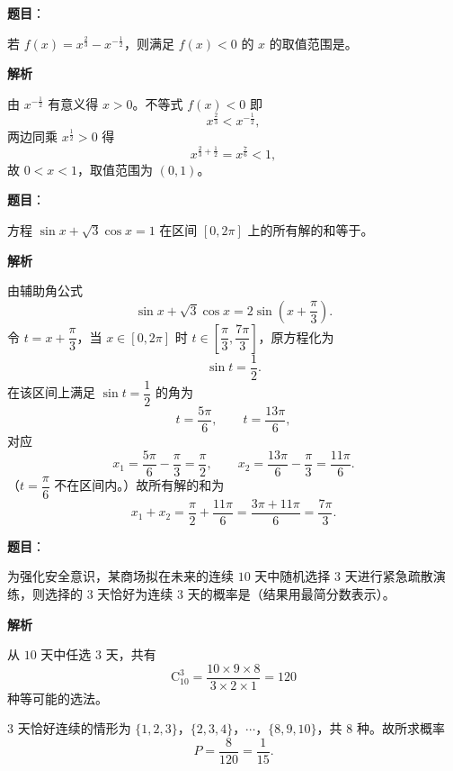 \begin{answer}

\textbf{题目}：

若 $f(x)=x^{\frac23}-x^{-\frac12}$，则满足 $f(x)<0$ 的 $x$ 的取值范围是\gkblank{}。

\textbf{解析}

由 $x^{-\frac12}$ 有意义得 $x>0$。不等式 $f(x)<0$ 即
\nopagebreak[4]
\[x^{\frac23}<x^{-\frac12},\]
两边同乘 $x^{\frac12}>0$ 得
\nopagebreak[4]
\[x^{\frac23+\frac12}=x^{\frac76}<1,\]
故 $0<x<1$，取值范围为 $(0,1)$。


\end{answer}
\begin{answer}

\textbf{题目}：

方程 $\sin x+\sqrt3\cos x=1$ 在区间 $[0,2\pi]$ 上的所有解的和等于\gkblank{}。

\textbf{解析}

由辅助角公式
\nopagebreak[4]
\[\sin x+\sqrt3\cos x=2\sin\left(x+\frac\pi3\right).\]
令 $t=x+\dfrac\pi3$，当 $x\in[0,2\pi]$ 时 $t\in\left[\dfrac\pi3,\dfrac{7\pi}3\right]$，原方程化为
\nopagebreak[4]
\[\sin t=\frac12 .\]
在该区间上满足 $\sin t=\dfrac12$ 的角为
\nopagebreak[4]
\[t=\frac{5\pi}6,\qquad t=\frac{13\pi}6,\]
对应
\nopagebreak[4]
\[x_1=\frac{5\pi}6-\frac\pi3=\frac\pi2,\qquad x_2=\frac{13\pi}6-\frac\pi3=\frac{11\pi}6 .\]
（$t=\dfrac\pi6$ 不在区间内。）故所有解的和为
\nopagebreak[4]
\[x_1+x_2=\frac\pi2+\frac{11\pi}6=\frac{3\pi+11\pi}6=\frac{7\pi}3 .\]


\end{answer}
\begin{answer}

\textbf{题目}：

为强化安全意识，某商场拟在未来的连续 $10$ 天中随机选择 $3$ 天进行紧急疏散演练，则选择的 $3$ 天恰好为连续 $3$ 天的概率是\gkblank{}（结果用最简分数表示）。

\textbf{解析}

从 $10$ 天中任选 $3$ 天，共有
\nopagebreak[4]
\[\mathrm C_{10}^3=\frac{10\times9\times8}{3\times2\times1}=120\]
种等可能的选法。

$3$ 天恰好连续的情形为 $\{1,2,3\}$，$\{2,3,4\}$，$\cdots$，$\{8,9,10\}$，共 $8$ 种。故所求概率
\nopagebreak[4]
\[P=\frac8{120}=\frac1{15}.\]


\end{answer}

